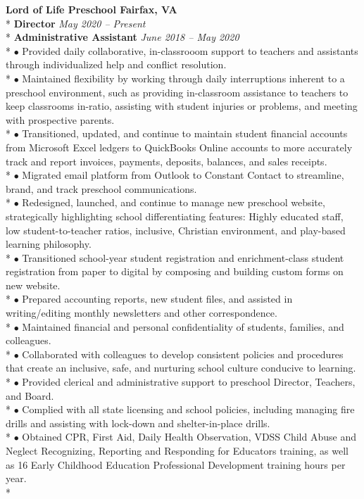 \documentclass{article}
\begin{document}
\begin{samepage}
\noindent \textbf{Lord of Life Preschool \hfill Fairfax, VA} \\*
\textbf{Director} \hfill \textit{May 2020 -- Present} \\*
\textbf{Administrative Assistant} \hfill \textit{June 2018 -- May 2020} \\*
\noindent $\bullet$ Provided daily collaborative, in-classrooom support to teachers and assistants through individualized help and conflict resolution.\\*
\noindent $\bullet$ Maintained flexibility by working through daily interruptions inherent to a preschool environment, such as providing in-classroom assistance to teachers to keep classrooms in-ratio, assisting with student injuries or problems, and meeting with prospective parents.\\*
\noindent $\bullet$ Transitioned, updated, and continue to maintain student financial accounts from Microsoft Excel ledgers to QuickBooks Online accounts to more accurately track and report invoices, payments, deposits, balances, and sales receipts.\\*
\noindent $\bullet$ Migrated email platform from Outlook to Constant Contact to streamline, brand, and track preschool communications.\\*
\noindent $\bullet$ Redesigned, launched, and continue to manage new preschool website, strategically highlighting school differentiating features: Highly educated staff, low student-to-teacher ratios, inclusive, Christian environment, and play-based learning philosophy.\\*
\noindent $\bullet$ Transitioned school-year student registration and enrichment-class student registration from paper to digital by composing and building custom forms on new website.\\*   
\noindent $\bullet$ Prepared accounting reports, new student files, and assisted in writing/editing monthly newsletters and other correspondence.\\*
\noindent $\bullet$ Maintained financial and personal confidentiality of students, families, and colleagues.\\*
\noindent $\bullet$ Collaborated with colleagues to develop consistent policies and procedures that create an inclusive, safe, and nurturing school culture conducive to learning.\\*
\noindent $\bullet$ Provided clerical and administrative support to preschool Director, Teachers, and Board.\\*
\noindent $\bullet$ Complied with all state licensing and school policies, including managing fire drills and assisting with lock-down and shelter-in-place drills.\\*
\noindent $\bullet$ Obtained CPR, First Aid, Daily Health Observation, VDSS Child Abuse and Neglect Recognizing, Reporting and Responding for Educators training, as well as 16 Early Childhood Education Professional Development training hours per year.\\*
\end{samepage}
\end{document}

